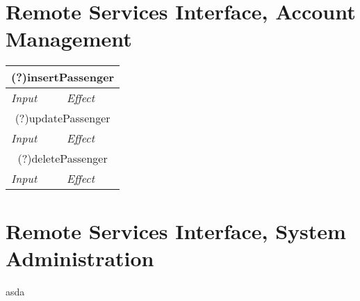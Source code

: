\documentclass[11pt,oneside,a4paper]{report}
\newcommand{\note}[1]{}
\newcommand{\method}[1]{\multicolumn{2}{|c|}{{#1}}\\\hline
	\textit{Input} & \textit{Effect} \\\hline}
\begin{document}
\section{Remote Services Interface, Account Management}
\begin{tabular}{p{5cm}|p{6cm}}
	\hline
	
	\method{(?)insertPassenger}

	\method{(?)updatePassenger}

	\method{(?)deletePassenger}
	
\end{tabular}


\section{Remote Services Interface, System Administration}
asda\note{We should be uniform in notation, and probably also revise a bit the DD}
\end{document}
